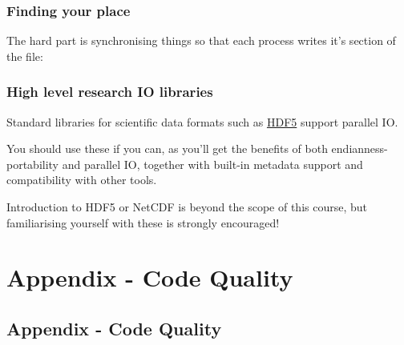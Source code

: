 \subsubsection{Finding your place}\label{finding-your-place}

The hard part is synchronising things so that each process writes it's
section of the file:

\begin{Shaded}
\begin{Highlighting}[]

    \NormalTok{* }\NormalTok{(}\NormalTok{) +                                      }
               \NormalTok{(}\NormalTok{) +          }
               \NormalTok{(}\NormalTok{); }

\end{Highlighting}
\end{Shaded}

\subsubsection{High level research IO
libraries}\label{high-level-research-io-libraries}

Standard libraries for scientific data formats such as
\href{http://www.hdfgroup.org/HDF5/}{HDF5} support parallel IO.

You should use these if you can, as you'll get the benefits of both
endianness-portability and parallel IO, together with built-in metadata
support and compatibility with other tools.

Introduction to HDF5 or NetCDF is beyond the scope of this course, but
familiarising yourself with these is strongly encouraged!

\section{Appendix - Code Quality}\label{appendix---code-quality}

\subsection{Appendix - Code Quality}\label{appendix---code-quality-1}

